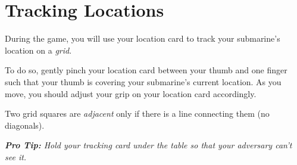 \section*{Tracking Locations}
During the game, you will use your location card to track your submarine's location on a \emph{grid}. 

To do so, gently pinch your location card between your thumb and one finger such that your thumb is covering your submarine's current location.
As you move, you should adjust your grip on your location card accordingly.

Two grid squares are \emph{adjacent} only if there is a line connecting them (no diagonals).

\textit{\textbf{Pro Tip:} Hold your tracking card under the table so that your adversary can't see it.}%
